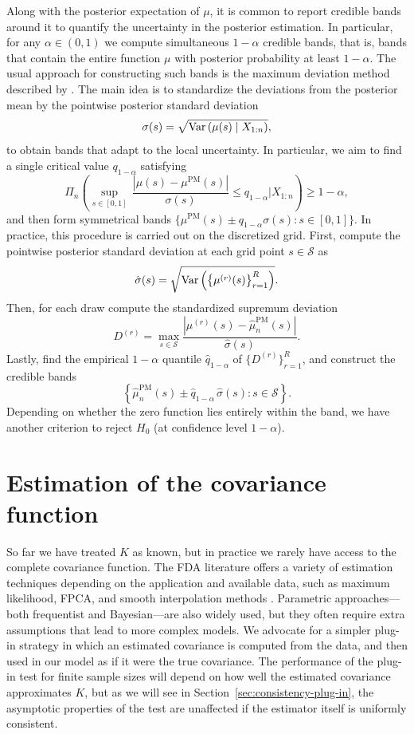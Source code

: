 Along with the posterior expectation of \(\mu\), it is common to report credible bands around it to quantify the uncertainty in the posterior estimation. In particular, for any \(\alpha\in(0,1)\) we compute simultaneous \(1-\alpha\) credible bands, that is, bands that contain the entire function \(\mu\) with posterior probability at least \(1-\alpha\). The usual approach for constructing such bands is the maximum deviation method described by \citet{crainiceanu2007spatially}. The main idea is to standardize the deviations from the posterior mean by the pointwise posterior standard deviation 
\[
  \sigma(s)=\sqrt{\operatorname{Var}\left(\mu(s)\mid X_{1:n}\right)},
\]
to obtain bands that adapt to the local uncertainty. In particular, we aim to find a single critical value \(q_{1-\alpha}\) satisfying
\[
\Pi_n\left(\sup_{s\in [0,1]}\, \frac{|\mu(s) - \mu^{\text{PM}}(s)|}{\sigma(s)} \leq q_{1-\alpha} \mathrel{\big\vert} X_{1:n}\right) \geq 1-\alpha,
\]
and then form symmetrical bands \(\{\mu^{\text{PM}}(s) \pm q_{1-\alpha}\sigma(s): s\in [0,1]\}\). In practice, this procedure is carried out on the discretized grid. First, compute the pointwise posterior standard deviation at each grid point \(s\in\mathcal S\) as 
\[
\hat\sigma(s)=\sqrt{\operatorname{Var}\left(\left\{\mu^{(r)}(s)\right\}_{r=1}^R\right)}.
\]
Then, for each draw compute the standardized supremum deviation
\[
D^{(r)} = \max_{s\in\mathcal S} \frac{|\mu^{(r)}(s) - \hat\mu_n^{\text{PM}}(s)|}{\hat\sigma(s)}.
\]
Lastly, find the empirical \(1-\alpha\) quantile \(\hat q_{1-\alpha}\) of \(\{D^{(r)}\}_{r=1}^R\), and construct the credible bands 
\[
  \left\{\hat\mu_n^{\text{PM}}(s) \pm \hat q_{1-\alpha}\,\hat\sigma(s): s \in \mathcal S\right\}.
\]
Depending on whether the zero function lies entirely within the band, we have another criterion to reject \(H_0\) (at confidence level \(1-\alpha\)).

\section{Estimation of the covariance function}\label{sec:covariance-estimation} 

So far we have treated \(K\) as known, but in practice we rarely have access to the complete covariance function. The \acs{FDA} literature offers a variety of estimation techniques depending on the application and available data, such as maximum likelihood, \acf{FPCA}, and smooth interpolation methods \citep[e.g.][]{li2010uniform, xiao2018fast, wong2019nonparametric,mbaka2025estimating}. Parametric approaches---both frequentist and Bayesian---are also widely used, but they often require extra assumptions that lead to more complex models. We advocate for a simpler plug-in strategy in which an estimated covariance is computed from the data, and then used in our model as if it were the true covariance. The performance of the plug-in test for finite sample sizes will depend on how well the estimated covariance approximates \(K\), but as we will see in Section~\ref{sec:consistency-plug-in}, the asymptotic properties of the test are unaffected if the estimator itself is uniformly consistent.

